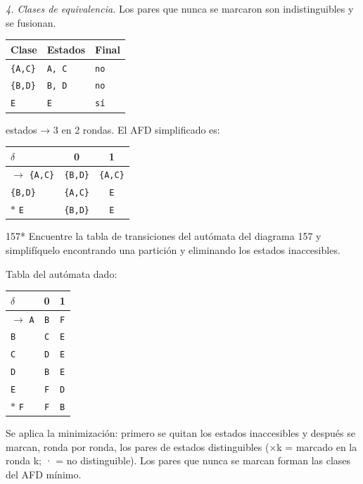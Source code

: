 \documentclass[11pt]{article}
\begin{document}
\textit{4. Clases de equivalencia.} Los pares que nunca se marcaron son indistinguibles y se fusionan.
\begin{center}\footnotesize\begin{tabular}{lll}\toprule
Clase & Estados & Final \\\midrule
\texttt{\{A,C\}} & \texttt{A, C} & \texttt{no} \\
\texttt{\{B,D\}} & \texttt{B, D} & \texttt{no} \\
\texttt{E} & \texttt{E} & \texttt{sí} \\
\bottomrule\end{tabular}\end{center}

 estados → 3 en 2 rondas. El AFD simplificado es:
\begin{center}\small\begin{tabular}{lcc}\toprule
$\delta$ & 0 & 1 \\\midrule
$\to$ \texttt{\{A,C\}} & \texttt{\{B,D\}} & \texttt{\{A,C\}} \\
 \texttt{\{B,D\}} & \texttt{\{A,C\}} & \texttt{E} \\
$*$ \texttt{E} & \texttt{\{B,D\}} & \texttt{E} \\
\bottomrule\end{tabular}\end{center}



\begin{ejercicio}{157}{*}
Encuentre la tabla de transiciones del autómata del diagrama 157 y simplifíquelo encontrando una partición y eliminando los estados inaccesibles.
\end{ejercicio}
\proc Tabla del autómata dado:
\begin{center}\small\begin{tabular}{lcc}\toprule
$\delta$ & 0 & 1 \\\midrule
$\to$ \texttt{A} & \texttt{B} & \texttt{F} \\
 \texttt{B} & \texttt{C} & \texttt{E} \\
 \texttt{C} & \texttt{D} & \texttt{E} \\
 \texttt{D} & \texttt{B} & \texttt{E} \\
 \texttt{E} & \texttt{F} & \texttt{D} \\
$*$ \texttt{F} & \texttt{F} & \texttt{B} \\
\bottomrule\end{tabular}\end{center}
Se aplica la minimización: primero se quitan los estados inaccesibles y después se marcan, ronda por ronda, los pares de estados distinguibles (×k = marcado en la ronda k; · = no distinguible). Los pares que nunca se marcan forman las clases del AFD mínimo.
\end{document}
